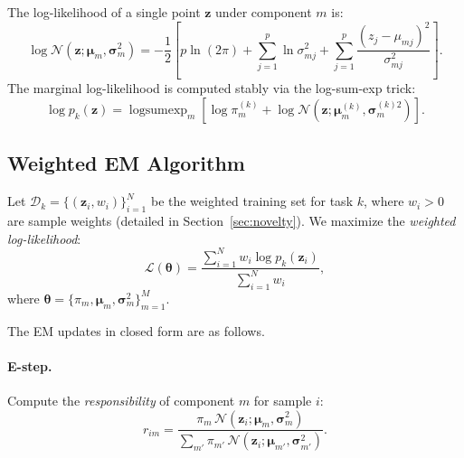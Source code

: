 \documentclass[12pt,a4paper]{article}
\begin{document}
The log-likelihood of a single point $\mathbf{z}$ under component $m$ is:
\begin{equation}
    \log \mathcal{N}\!\left(\mathbf{z};\bm{\mu}_m, \bm{\sigma}_m^2\right)
    = -\frac{1}{2}\left[p\ln(2\pi) + \sum_{j=1}^p \ln \sigma_{mj}^2
    + \sum_{j=1}^p \frac{(z_j - \mu_{mj})^2}{\sigma_{mj}^2}\right].
    \label{eq:logN}
\end{equation}
The marginal log-likelihood is computed stably via the log-sum-exp trick:
\begin{equation}
    \log p_k(\mathbf{z}) = \operatorname{logsumexp}_m\!\left[\log\pi_m^{(k)} + \log \mathcal{N}(\mathbf{z};\bm{\mu}_m^{(k)},\bm{\sigma}_m^{(k)2})\right].
    \label{eq:logpk}
\end{equation}

\subsection{Weighted EM Algorithm}
\label{sec:wem}

Let $\mathcal{D}_k = \{(\mathbf{z}_i, w_i)\}_{i=1}^N$ be the weighted training set for task $k$, where $w_i > 0$ are sample weights (detailed in Section~\ref{sec:novelty}).
We maximize the \emph{weighted log-likelihood}:
\begin{equation}
    \mathcal{L}(\bm{\theta}) = \frac{\sum_{i=1}^N w_i \log p_k(\mathbf{z}_i)}{\sum_{i=1}^N w_i},
    \label{eq:wll}
\end{equation}
where $\bm{\theta} = \{\pi_m, \bm{\mu}_m, \bm{\sigma}_m^2\}_{m=1}^M$.

The EM updates in closed form are as follows.

\paragraph{E-step.} Compute the \emph{responsibility} of component $m$ for sample $i$:
\begin{equation}
    r_{im} = \frac{\pi_m \, \mathcal{N}(\mathbf{z}_i;\bm{\mu}_m,\bm{\sigma}_m^2)}{\sum_{m'} \pi_{m'}\,\mathcal{N}(\mathbf{z}_i;\bm{\mu}_{m'},\bm{\sigma}_{m'}^2)}.
    \label{eq:resp}
\end{equation}
\end{document}
